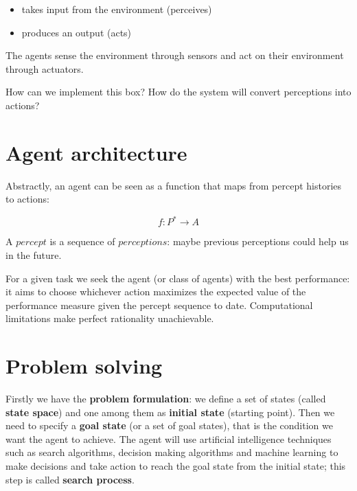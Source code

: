 \documentclass{article}
\begin{document}
\begin{center}
    \begin{itemize}
        \item takes input from the environment (perceives)
        \item produces an output (acts)
    \end{itemize}
\end{center}

The agents sense the environment through sensors and act on their environment through actuators.

How can we implement this box? How do the system will convert perceptions into actions?

\section{Agent architecture}

Abstractly, an agent can be seen as a function that maps from percept histories to actions:

\begin{center}
    \begin{equation}
        f: P^{*} \rightarrow A
    \end{equation}
\end{center}

A $percept$ is a sequence of $perceptions$: maybe previous perceptions could help us in the future.

For a given task we seek the agent (or class of agents) with the best performance: it aims to choose whichever action maximizes the expected value of the performance measure given the percept sequence to date.
Computational limitations make perfect rationality unachievable.

\section{Problem solving}

Firstly we have the \textbf{problem formulation}: we define a set of states (called \textbf{state space}) and one among them as \textbf{initial state} (starting point).
Then we need to specify a \textbf{goal state} (or a set of goal states), that is the condition we want the agent to achieve. The agent will use artificial intelligence techniques such as search algorithms, decision making algorithms and machine learning to make decisions and take action to reach the goal state from the initial state; this step is called \textbf{search process}. 
\end{document}
